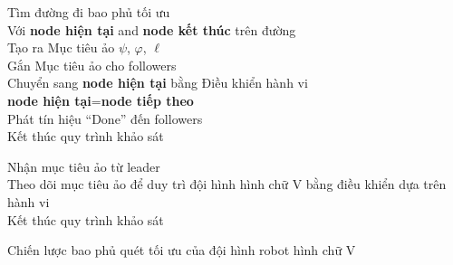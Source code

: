 \begin{algorithm}[!t]
{
    {
        {
            Tìm đường đi bao phủ tối ưu\\
        }
        \Else
        {
            Với \textbf{node hiện tại} and \textbf{node kết thúc} trên đường\\
            {
             Tạo ra Mục tiêu ảo $\psi$, $\varphi$, $\ell$\\
             Gắn Mục tiêu ảo cho followers \\
             Chuyển sang \textbf{node hiện tại} bằng Điều khiển hành vi\\
             \textbf{node hiện tại}=\textbf{node tiếp theo}\\
            }
            \Else
            {
                Phát tín hiệu ``Done'' đến followers\\
                Kết thúc quy trình khảo sát \\
            }
        }
    }
    
    {
        Nhận mục tiêu ảo từ leader\\
        Theo dõi mục tiêu ảo để duy trì đội hình hình chữ V bằng điều khiển dựa trên hành vi\\ 
        {
             Kết thúc quy trình khảo sát\\
        }
    }
}
\caption{Chiến lược bao phủ quét tối ưu của đội hình robot hình chữ V}
\label{alg:Covestrategy} 
\end{algorithm}


